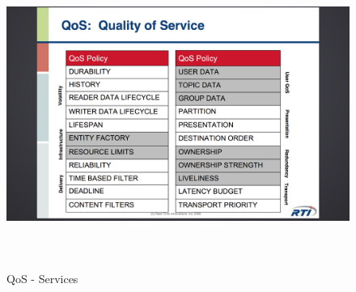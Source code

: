 \begin{figure}[h]
\centering
\includegraphics[height=100mm, keepaspectratio]{img/dds_question_4-6/QoS_services}
\caption{QoS - Services}
\label{QoS - Services}
\end{figure}

